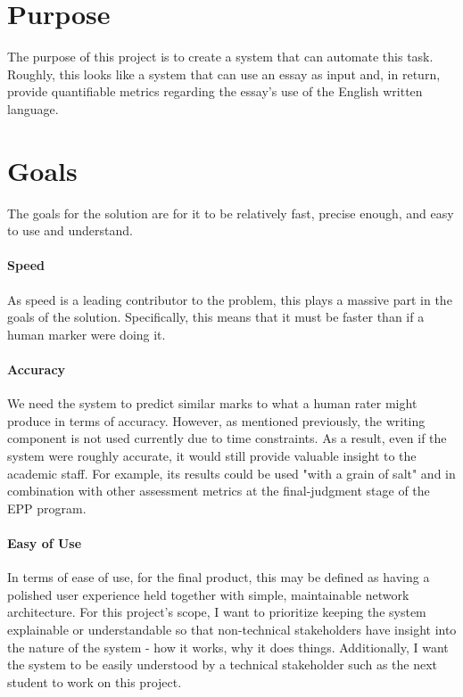 \section{Purpose}

The purpose of this project is to create a system that can automate this task.
Roughly, this looks like a system that can use an essay as input and, in return, provide quantifiable metrics regarding the essay's use of the English written language. 

\section{Goals}

The goals for the solution are for it to be relatively fast, precise enough, and easy to use and understand. 
\paragraph{Speed}
As speed is a leading contributor to the problem, this plays a massive part in the goals of the solution. Specifically, this means that it must be faster than if a human marker were doing it. 

\paragraph{Accuracy}
We need the system to predict similar marks to what a human rater might produce in terms of accuracy. However, as mentioned previously, the writing component is not used currently due to time constraints. As a result, even if the system were roughly accurate, it would still provide valuable insight to the academic staff. For example, its results could be used "with a grain of salt" and in combination with other assessment metrics at the final-judgment stage of the EPP program.

\paragraph{Easy of Use}
In terms of ease of use, for the final product, this may be defined as having a polished user experience held together with simple, maintainable network architecture. For this project's scope, I want to prioritize keeping the system explainable or understandable so that non-technical stakeholders have insight into the nature of the system - how it works, why it does things. Additionally, I want the system to be easily understood by a technical stakeholder such as the next student to work on this project. 

